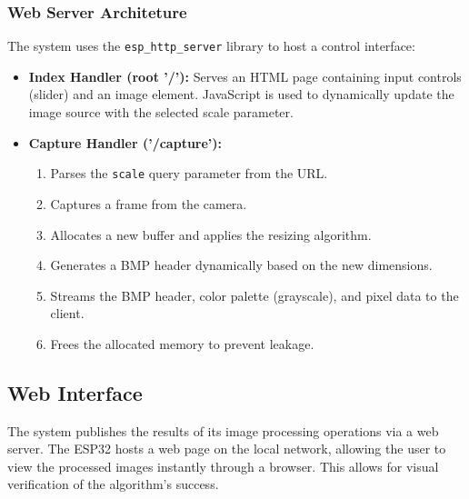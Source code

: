 \subsubsection{Web Server Architeture}
The system uses the \texttt{esp\_http\_server} library to host a control interface:
\begin{itemize}
    \item \textbf{Index Handler (root '/'):} Serves an HTML page containing input controls (slider) and an image element. JavaScript is used to dynamically update the image source with the selected scale parameter.
    \item \textbf{Capture Handler ('/capture'):} 
    \begin{enumerate}
        \item Parses the \texttt{scale} query parameter from the URL.
        \item Captures a frame from the camera.
        \item Allocates a new buffer and applies the resizing algorithm.
        \item Generates a BMP header dynamically based on the new dimensions.
        \item Streams the BMP header, color palette (grayscale), and pixel data to the client.
        \item Frees the allocated memory to prevent leakage.
    \end{enumerate}
\end{itemize}

\subsection{Web Interface}
The system publishes the results of its image processing operations via a web server. The ESP32 hosts a web page on the local network, allowing the user to view the processed images instantly through a browser. This allows for visual verification of the algorithm's success.
